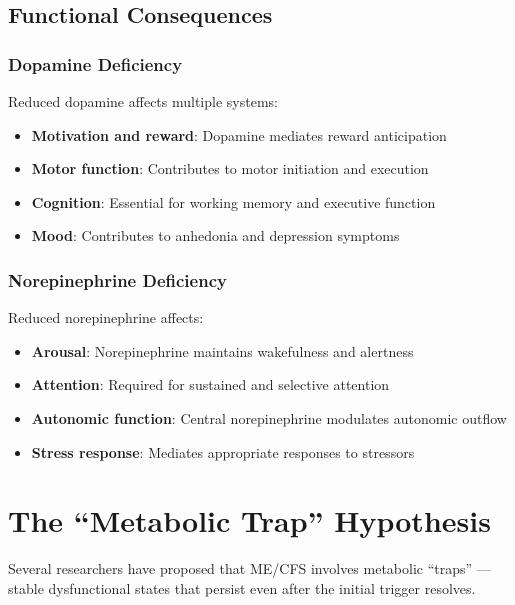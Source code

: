 \subsection{Functional Consequences}

\subsubsection{Dopamine Deficiency}

Reduced dopamine affects multiple systems:

\begin{itemize}
    \item \textbf{Motivation and reward}: Dopamine mediates reward anticipation
    \item \textbf{Motor function}: Contributes to motor initiation and execution
    \item \textbf{Cognition}: Essential for working memory and executive function
    \item \textbf{Mood}: Contributes to anhedonia and depression symptoms
\end{itemize}

\subsubsection{Norepinephrine Deficiency}

Reduced norepinephrine affects:

\begin{itemize}
    \item \textbf{Arousal}: Norepinephrine maintains wakefulness and alertness
    \item \textbf{Attention}: Required for sustained and selective attention
    \item \textbf{Autonomic function}: Central norepinephrine modulates autonomic outflow
    \item \textbf{Stress response}: Mediates appropriate responses to stressors
\end{itemize}

\section{The ``Metabolic Trap'' Hypothesis}
\label{sec:metabolic-trap}

Several researchers have proposed that ME/CFS involves metabolic ``traps'' --- stable dysfunctional states that persist even after the initial trigger resolves.

